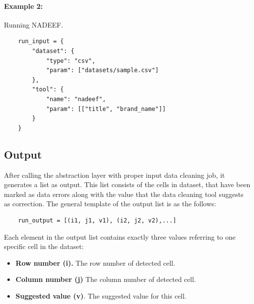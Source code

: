 \documentclass[12pt]{article}
\begin{document}
\paragraph{Example 2:} Running NADEEF.
\begin{lstlisting}
	run_input = {
		"dataset": {
			"type": "csv",
			"param": ["datasets/sample.csv"]
		},
		"tool": {
			"name": "nadeef",
			"param": [["title", "brand_name"]]
		}
	}
\end{lstlisting}


\subsection{Output}
After calling the abstraction layer with proper input data cleaning job, it generates a list as output. This list consists of the cells in dataset, that have been marked as data errors along with the value that the data cleaning tool suggests as correction. The general template of the output list is as the follows:
\begin{lstlisting}
	run_output = [(i1, j1, v1), (i2, j2, v2),...]
\end{lstlisting}
Each element in the output list contains exactly three values referring to one specific cell in the dataset:
\begin{itemize}
	\item \textbf{Row number (i).} The row number of detected cell.
	\item \textbf{Column number (j)} The column number of detected cell.
	\item \textbf{Suggested value (v)}. The suggested value for this cell. 
\end{itemize}




\end{document}
